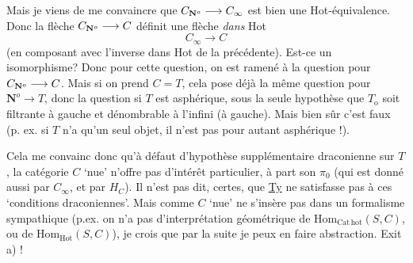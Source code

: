 Mais je viens de me convaincre que $C_{\mathbf{N}^{o}} \longrightarrow C_{\infty}$ est bien une Hot-équivalence. Donc la flèche $C_{\mathbf{N}^{o}} \longrightarrow C$ définit une flèche \textit{dans} Hot
\[
C_{\infty} \longrightarrow C
\]
(en composant avec l'inverse dans Hot de la précédente). Est-ce un isomorphisme? Donc pour cette question, on est ramené à la question pour $C_{\mathbf{N}^{o}} \longrightarrow C$. Mais si on prend $C = T$, cela pose déjà la même question pour $\mathbf{N}^{o} \longrightarrow T$, donc la question si $T$ est asphérique, sous la seule hypothèse que $T_{\mathrm{o}}$ soit filtrante à gauche et dénombrable à l'infini (à gauche). Mais bien sûr c'est faux (p. ex. si $T$ n'a qu'un seul objet, il n'est pas pour autant asphérique !).

Cela me convainc donc qu'à défaut
d'hypothèse supplémentaire draconienne sur $T$, la catégorie $C$ `nue' n'offre pas d'intérêt particulier, à part son $\pi_{0}$ (qui est donné aussi par $C_{\infty}$, et par $H_{C}$). Il n'est pas dit, certes, que \underline{Ty} ne satisfasse pas à ces `conditions draconiennes'. Mais comme $C$ `nue' ne s'insère pas dans un formalisme sympathique (p.ex. on n'a pas d'interprétation géométrique de $\mathrm{Hom}_{\mathrm{Cat\,hot}}(S,C)$, ou de $\mathrm{Hom}_{\mathrm{Hot}}(S,C)$), je crois que par la suite je peux en faire abstraction. Exit a) !

